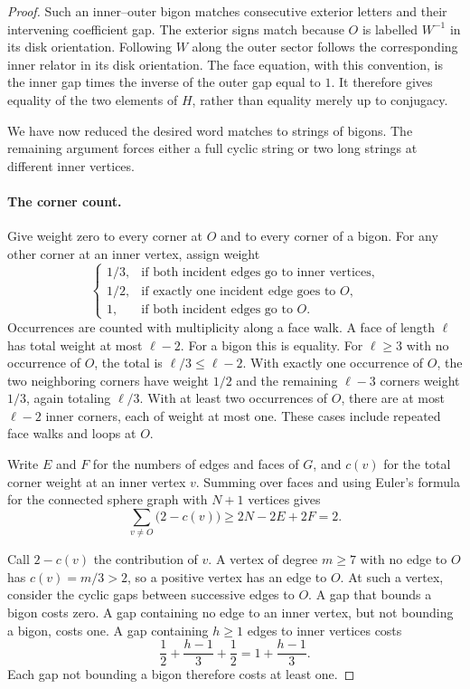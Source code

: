 \begin{proof}
Such an inner--outer bigon matches consecutive exterior letters and
their intervening coefficient gap.  The exterior signs match because
$O$ is labelled $W^{-1}$ in its disk orientation.  Following $W$ along
the outer sector follows the corresponding inner relator in its disk
orientation.  The face equation, with this convention, is the inner
gap times the inverse of the outer gap equal to $1$.  It therefore gives
equality of the two elements of $H$, rather than equality merely up to
conjugacy.

We have now reduced the desired word matches to strings of bigons.
The remaining argument forces either a full cyclic string or two long
strings at different inner vertices.

\paragraph{The corner count.}
Give weight zero to every corner at $O$ and to every corner of a bigon.
For any other corner at an inner vertex, assign weight
\[
 \begin{cases}
  1/3,&\text{if both incident edges go to inner vertices},\\
  1/2,&\text{if exactly one incident edge goes to }O,\\
  1,&\text{if both incident edges go to }O.
 \end{cases}
\]
Occurrences are counted with multiplicity along a face walk.  A face
of length $\ell$ has total weight at most $\ell-2$.  For a bigon this
is equality.  For $\ell\geq3$ with no occurrence of $O$, the total is
$\ell/3\leq\ell-2$.  With exactly one occurrence of $O$, the two
neighboring corners have weight $1/2$ and the remaining $\ell-3$
corners weight $1/3$, again totaling $\ell/3$.  With at least two
occurrences of $O$, there are at most $\ell-2$ inner corners, each of
weight at most one.  These cases include repeated face walks and loops
at $O$.

Write $E$ and $F$ for the numbers of edges and faces of $G$, and $c(v)$
for the total corner weight at an inner vertex $v$.  Summing over faces
and using Euler's formula for the connected sphere graph with $N+1$
vertices gives
\begin{equation}
\label{planar:curvature}
 \sum_{v\ne O}\bigl(2-c(v)\bigr)
 \geq 2N-2E+2F=2.
\end{equation}

Call $2-c(v)$ the contribution of $v$.  A vertex of degree $m\geq7$
with no edge to $O$ has $c(v)=m/3>2$, so a positive vertex has an edge
to $O$.  At such a vertex, consider the cyclic gaps between successive
edges to $O$.  A gap that bounds a bigon costs zero.  A gap containing
no edge to an inner vertex, but not bounding a bigon, costs one.  A
gap containing $h\geq1$ edges to inner vertices costs
\[
 \frac12+\frac{h-1}{3}+\frac12
 =1+\frac{h-1}{3}.
\]
Each gap not bounding a bigon therefore costs at least one.


\end{proof}
